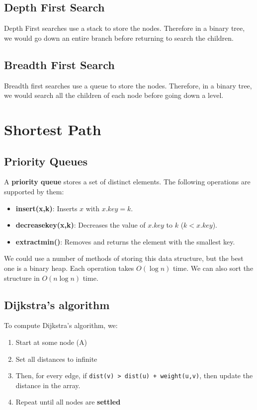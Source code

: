 \documentclass[11pt,fleqn,a4paper,titlepage,dvipsnames,cmyk]{scrartcl}
\begin{document}
\subsection{Depth First Search}%
\label{sub:dfs}
Depth First searches use a stack to store the nodes. Therefore in a binary
tree, we would go down an entire branch before returning to search the
children.

\subsection{Breadth First Search}%
\label{sub:bfs}
Breadth first searches use a queue to store the nodes. Therefore, in a
binary tree, we would search all the children of each node before going
down a level.

\section{Shortest Path}%
\label{sec:shortest-path}

\subsection{Priority Queues}%
\label{sub:priority-queues}
A \textbf{priority queue} stores a set of distinct elements. The following
operations are supported by them:
\begin{itemize}
    \item \textbf{insert(x,k)}: Inserts $x$ with $x.key = k$.
    \item \textbf{decreasekey(x,k)}: Decreases the value of $x.key$ to $k$
        ($k < x.key$).
    \item \textbf{extractmin()}: Removes and returns the element with the
        smallest key.
\end{itemize}

We could use a number of methods of storing this data structure, but the
best one is a binary heap. Each operation takes $O(\log n)$ time. We can
also sort the structure in $O(n \log n)$ time.

\subsection{Dijkstra's algorithm}%
\label{sub:Dijkstra's algorithm}
To compute Dijkstra's algorithm, we:
\begin{enumerate}
    \item Start at some node (A)
    \item Set all distances to infinite
    \item Then, for every edge, if \texttt{dist(v) > dist(u) +
        weight(u,v)}, then update the distance in the array.
    \item Repeat until all nodes are \textbf{settled}
\end{enumerate}
\end{document}
